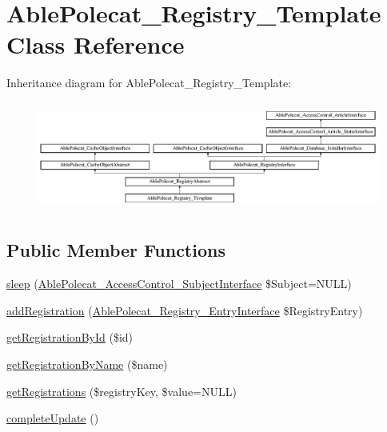 \hypertarget{class_able_polecat___registry___template}{}\section{Able\+Polecat\+\_\+\+Registry\+\_\+\+Template Class Reference}
\label{class_able_polecat___registry___template}
Inheritance diagram for Able\+Polecat\+\_\+\+Registry\+\_\+\+Template\+:\begin{figure}[H]
\begin{center}
\leavevmode
\includegraphics[height=3.612903cm]{class_able_polecat___registry___template}
\end{center}
\end{figure}
\subsection*{Public Member Functions}
\begin{DoxyCompactItemize}
\item 
\hyperlink{class_able_polecat___registry___template_a365e24d7b066205cafa2a5cce3a4f224}{sleep} (\hyperlink{interface_able_polecat___access_control___subject_interface}{Able\+Polecat\+\_\+\+Access\+Control\+\_\+\+Subject\+Interface} \$Subject=N\+U\+L\+L)
\item 
\hyperlink{class_able_polecat___registry___template_a22d8ddb551ccf544f1d2615db68ca9b1}{add\+Registration} (\hyperlink{interface_able_polecat___registry___entry_interface}{Able\+Polecat\+\_\+\+Registry\+\_\+\+Entry\+Interface} \$Registry\+Entry)
\item 
\hyperlink{class_able_polecat___registry___template_a06a999816a4143bb407c09628018a874}{get\+Registration\+By\+Id} (\$id)
\item 
\hyperlink{class_able_polecat___registry___template_a11594a43c95ab62b4841717c17cf0e54}{get\+Registration\+By\+Name} (\$name)
\item 
\hyperlink{class_able_polecat___registry___template_a8ed45a29bdb30603896e12d7bbf208b5}{get\+Registrations} (\$registry\+Key, \$value=N\+U\+L\+L)
\item 
\hyperlink{class_able_polecat___registry___template_a363ee22699ad46520333ef24f64798bb}{complete\+Update} ()
\end{DoxyCompactItemize}
